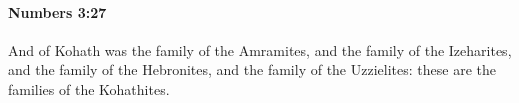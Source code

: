 
		\paragraph{Numbers 3:27} %
			\label{NUMBERS-3-27}

			And of Kohath was the family of the Amramites, and the family of the Izeharites, and the family of the Hebronites, and the family of the Uzzielites: these are the families of the Kohathites.


